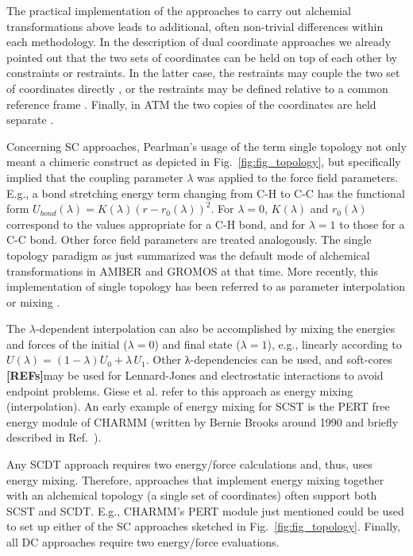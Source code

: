 \documentclass[9pt,bestpractices]{livecoms}
\newcommand{\rref}{{\bfseries[REFs]}{}}
\begin{document}
The practical implementation of the approaches to carry out alchemial transformations above leads to additional, often non-trivial differences within each methodology. In the description of dual coordinate approaches we already pointed out that the two sets of coordinates can be held on top of each other by constraints \cite{jiang2019computing,lee2023aces} or restraints. In the latter case, the restraints may couple the two set of coordinates directly \cite{Axelsen_1998,Ries_2022}, or the restraints may be defined relative to a common reference frame \cite{rocklin2013separated,Baumann_2023}. Finally, in ATM the two copies of the coordinates are held separate \cite{azimi2022relative}.

Concerning SC approaches, Pearlman’s usage of the term single topology not only meant a chimeric construct as depicted in Fig.~\ref{fig:fig_topology}, but specifically implied that the coupling parameter $\lambda$ was applied to the force field parameters. E.g., a bond stretching energy term changing from C-H to C-C has the functional form $U_{bond}(\lambda)=K(\lambda)(r-r_0(\lambda))^2$. For $\lambda=0$, $K(\lambda)$ and $r_0(\lambda)$ correspond to the values appropriate for a C-H bond, and for $\lambda=1$ to those for a C-C bond. Other force field parameters are treated analogously. The single topology paradigm as just summarized was the default mode of alchemical transformations in AMBER and GROMOS at that time.  More recently, this implementation of single topology has been referred to as parameter interpolation or mixing \cite{Giese_2018}. 

The $\lambda$-dependent interpolation can also be accomplished by mixing the energies and forces of the initial ($\lambda=0$) and final state ($\lambda=1$), e.g., linearly according to $U(\lambda)=(1-\lambda) U_0+\lambda\,U_1$. Other λ-dependencies can be used, and soft-cores \rref may be used for Lennard-Jones and electrostatic interactions to avoid endpoint problems. Giese et al. \cite{Giese_2018} refer to this approach as energy mixing (interpolation).%
An early example of energy mixing for SCST is the PERT free energy module of CHARMM (written by Bernie Brooks around 1990 and briefly described in Ref.~\cite{brooks_2009}).

Any SCDT approach requires two energy/force calculations and, thus, uses energy mixing. Therefore, approaches that implement energy mixing together with an alchemical topology (a single set of coordinates) often support both SCST and SCDT. E.g., CHARMM's PERT module just mentioned could be used to set up either of the SC approaches sketched in Fig.~\ref{fig:fig_topology}. Finally, all DC approaches require two energy/force evaluations.
\end{document}
